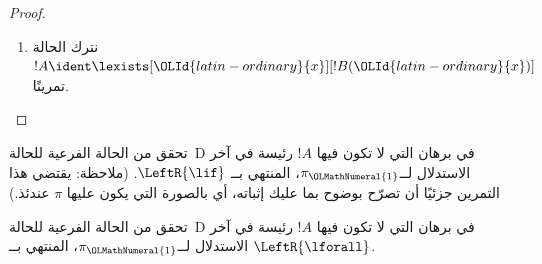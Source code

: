 \documentclass[../../../include/open-logic-section]{subfiles}
\begin{document}
\begin{proof}
\begin{enumerate}
المتتالية النهائية لــ!!{proof}~$\pi_{\OLMathNumeral{1}}'$ هي ${\OLId{greek-variable}{Gamma}} \Sequent {\OLId{greek-variable}{Delta}},
!B({\OLId{latin-ordinary}{c}})$، حيث ${\OLId{latin-ordinary}{c}}$ المتغير المميز لاستدلال~$\RightR{\lforall}$. ولذلك لا يرد
${\OLId{latin-ordinary}{c}}$ في~$!B({\OLId{latin-ordinary}{x}})$ أو ${\OLId{greek-variable}{Gamma}}$ أو~${\OLId{greek-variable}{Delta}}$. نفرض أن !!{proof}~$\pi$ منتظم،
ومن ثم لا يكون ${\OLId{latin-ordinary}{c}}$ المتغير المميز إلا لاستدلال~$\RightR{\lforall}$ الآتي،
ولا يرد إلا فوقه، أي لا يرد إلا في~$\pi_{\OLMathNumeral{1}}'$، وليس متغيرًا مميزًا لاستدلال
في~$\pi_{\OLMathNumeral{1}}'$. ولما كان ${\OLId{latin-ordinary}{c}}$ لا يرد في~$\pi_{\OLMathNumeral{2}}$، فلا يجوز أن يرد في~${\OLId{latin-ordinary}{t}}$.
وبحسب  يكون
!!{proof}~$\Subst{\pi_{\OLMathNumeral{1}}'}{{\OLId{latin-ordinary}{t}}}{{\OLId{latin-ordinary}{c}}}$ هو !!a{proof} لــ${\OLId{greek-variable}{Gamma}} \Sequent
{\OLId{greek-variable}{Delta}}, !B({\OLId{latin-ordinary}{t}})$. ونطبّق الآن فرض الاستقراء على !!{proof}
\[
\AxiomC{}
\RightLabel{$\Subst{\pi_{\OLMathNumeral{1}}'}{{\OLId{latin-ordinary}{t}}}{{\OLId{latin-ordinary}{c}}}$}
\Deduce${\OLId{greek-variable}{Gamma}} \fCenter {\OLId{greek-variable}{Delta}}, !B({\OLId{latin-ordinary}{t}})$
\AxiomC{}
\RightLabel{$\pi_{\OLMathNumeral{2}}''$}
\Deduce$!B({\OLId{latin-ordinary}{t}}), {\OLId{greek-variable}{Gamma}} \fCenter {\OLId{greek-variable}{Delta}}$
\RightLabel{\CutCS}
\BinaryInf${\OLId{greek-variable}{Gamma}} \fCenter {\OLId{greek-variable}{Delta}}$
\DisplayProof
\]
(ينطبق فرض الاستقراء لأن !!{formula} القطع هي~$!B({\OLId{latin-ordinary}{t}})$، ولذلك تكون رتبة
القطع في !!{proof} أدنى منها في~$\pi$.)
\item نترك الحالة $!A \ident \lexists[{\OLId{latin-ordinary}{x}}][!B({\OLId{latin-ordinary}{x}})]$ تمرينًا.
\end{enumerate}
\end{proof}

\begin{prob}
تحقق من الحالة الفرعية للحالة~D في برهان  التي لا
تكون فيها $!A$ رئيسة في آخر الاستدلال لــ$\pi_{\OLMathNumeral{1}}$، المنتهي بــ
$\LeftR{\lif}$. (ملاحظة: يقتضي هذا التمرين جزئيًا أن تصرّح بوضوح بما عليك
إثباته، أي بالصورة التي يكون عليها $\pi$ عندئذ.)
\end{prob}

\begin{prob}
تحقق من الحالة الفرعية للحالة~D في برهان  التي لا
تكون فيها $!A$ رئيسة في آخر الاستدلال لــ$\pi_{\OLMathNumeral{1}}$، المنتهي بــ
$\LeftR{\lforall}$.
\end{prob}
\end{document}
